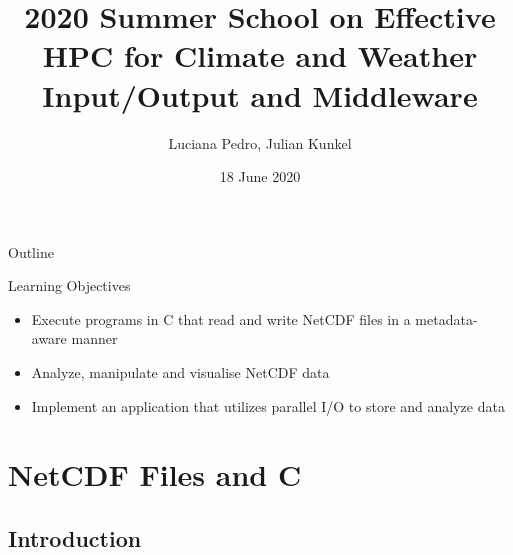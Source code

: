 \documentclass[compress,11pt,xcolor=svgnames,aspectratio=169]{beamer}
\title[Input/Output and Middleware -- Lab Session]{2020 Summer School on Effective HPC for Climate and Weather \\[0.5cm] Input/Output and Middleware}
\author[Pedro, Kunkel]{Luciana Pedro, Julian Kunkel
}
\institute[WP4 Team]{Department of Computer Science, University of Reading}
\date{18 June 2020}
\begin{document}
\begin{frame}[plain]
    \titlepage
\end{frame}

\begin{withoutheadline}
\begin{frame}{Outline}
    \begin{centering}
    \tableofcontents[hideallsubsections]
    \end{centering}

    \disclaimer
\end{frame}
\end{withoutheadline}


\begin{frame}[fragile]{Learning Objectives}

\begin{itemize}
\setlength\itemsep{1cm}
  \item Execute programs in C that read and write NetCDF files in a metadata-aware manner
  \item Analyze, manipulate and visualise NetCDF data
  \item Implement an application that utilizes parallel I/O to store and analyze data
\end{itemize}

\end{frame}

\section{NetCDF Files and C}


\subsection{Introduction}
\end{document}
